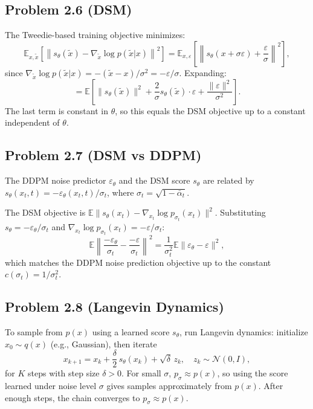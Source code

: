\documentclass[11pt]{article}
\begin{document}
\subsection*{Problem 2.6 (DSM)}

The Tweedie-based training objective minimizes:
\[
\mathbb{E}_{x, \tilde{x}}\!\left[\left\|s_\theta(\tilde{x}) - \nabla_{\tilde{x}} \log p(\tilde{x}|x)\right\|^2\right] = \mathbb{E}_{x,\varepsilon}\!\left[\left\|s_\theta(x + \sigma\varepsilon) + \frac{\varepsilon}{\sigma}\right\|^2\right],
\]
since $\nabla_{\tilde{x}} \log p(\tilde{x}|x) = -(\tilde{x}-x)/\sigma^2 = -\varepsilon/\sigma$. Expanding:
\[
= \mathbb{E}\!\left[\|s_\theta(\tilde{x})\|^2 + \frac{2}{\sigma}s_\theta(\tilde{x})\cdot\varepsilon + \frac{\|\varepsilon\|^2}{\sigma^2}\right].
\]
The last term is constant in $\theta$, so this equals the DSM objective up to a constant independent of $\theta$.

\subsection*{Problem 2.7 (DSM vs DDPM)}

The DDPM noise predictor $\varepsilon_\theta$ and the DSM score $s_\theta$ are related by $s_\theta(x_t, t) = -\varepsilon_\theta(x_t, t)/\sigma_t$, where $\sigma_t = \sqrt{1-\bar\alpha_t}$.

The DSM objective is $\mathbb{E}\|s_\theta(x_t) - \nabla_{x_t} \log p_{\sigma_t}(x_t)\|^2$. Substituting $s_\theta = -\varepsilon_\theta/\sigma_t$ and $\nabla_{x_t}\log p_{\sigma_t}(x_t) = -\varepsilon/\sigma_t$:
\[
\mathbb{E}\left\|\frac{-\varepsilon_\theta}{\sigma_t} - \frac{-\varepsilon}{\sigma_t}\right\|^2 = \frac{1}{\sigma_t^2}\mathbb{E}\|\varepsilon_\theta - \varepsilon\|^2,
\]
which matches the DDPM noise prediction objective up to the constant $c(\sigma_t) = 1/\sigma_t^2$.

\subsection*{Problem 2.8 (Langevin Dynamics)}

To sample from $p(x)$ using a learned score $s_\theta$, run Langevin dynamics: initialize $x_0 \sim q(x)$ (e.g., Gaussian), then iterate
\[
x_{k+1} = x_k + \frac{\delta}{2}\, s_\theta(x_k) + \sqrt{\delta}\, z_k, \quad z_k \sim \mathcal{N}(0, I),
\]
for $K$ steps with step size $\delta > 0$. For small $\sigma$, $p_\sigma \approx p(x)$, so using the score learned under noise level $\sigma$ gives samples approximately from $p(x)$. After enough steps, the chain converges to $p_\sigma \approx p(x)$.
\end{document}
